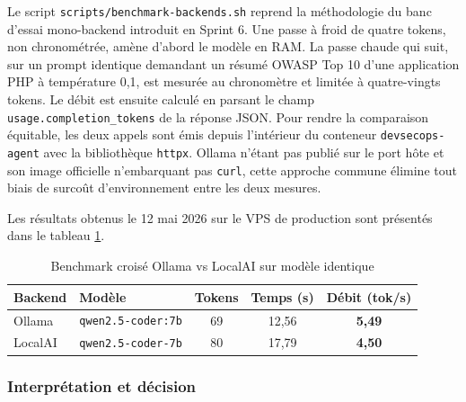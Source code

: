         Le script \texttt{scripts/\allowbreak{}benchmark-backends.\allowbreak{}sh} reprend la méthodologie du
        banc d'essai mono-backend introduit en Sprint 6. Une passe à froid de quatre
        tokens, non chronométrée, amène d'abord le modèle en RAM. La passe chaude
        qui suit, sur un prompt identique demandant un résumé OWASP Top 10 d'une
        application PHP à température 0,1, est mesurée au chronomètre et limitée à
        quatre-vingts tokens. Le débit est ensuite calculé en parsant le champ
        \texttt{usage.\allowbreak{}completion\_\allowbreak{}tokens} de la réponse JSON. Pour rendre la
        comparaison équitable, les deux appels sont émis depuis l'intérieur du
        conteneur \texttt{devsecops-agent} avec la bibliothèque \texttt{httpx}.
        Ollama n'étant pas publié sur le port hôte et son image officielle
        n'embarquant pas \texttt{curl}, cette approche commune élimine tout biais
        de surcoût d'environnement entre les deux mesures.

        Les résultats obtenus le 12 mai 2026 sur le VPS de production sont
        présentés dans le tableau \ref{tab:benchmark_backends}.

        \begin{table}[H]
        \centering
        \begin{tabular}{|m{2.5cm}|m{4.5cm}|c|c|c|}
        \hline
        \textbf{Backend} & \textbf{Modèle} & \textbf{Tokens} & \textbf{Temps (s)} & \textbf{Débit (tok/s)} \\
        \hline
        Ollama  & \texttt{qwen2.\allowbreak{}5-coder:7b}  & 69 & 12,56 & \textbf{5,49} \\
        \hline
        LocalAI & \texttt{qwen2.\allowbreak{}5-coder-7b}  & 80 & 17,79 & \textbf{4,50} \\
        \hline
        \end{tabular}
        \caption{Benchmark croisé Ollama vs LocalAI sur modèle identique}
        \label{tab:benchmark_backends}
        \end{table}

        \subsubsection{Interprétation et décision}

